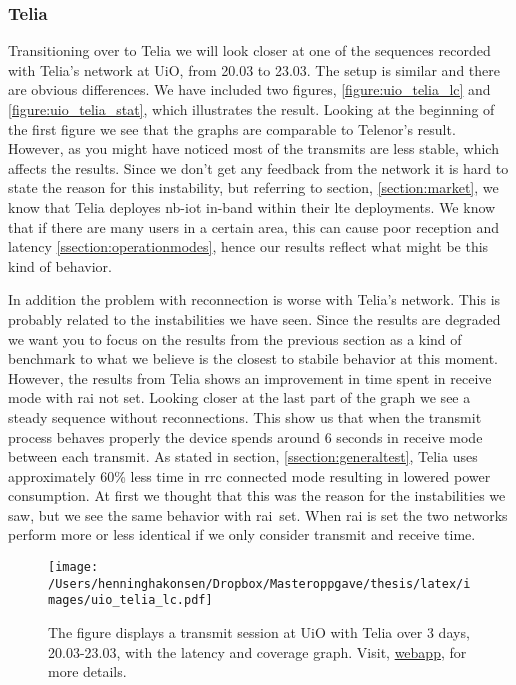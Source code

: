 \documentclass[USenglish]{ifimaster}  %
\begin{document}
\subsubsection{Telia}
Transitioning over to Telia we will look closer at one of the sequences recorded with Telia's network at UiO, from 20.03 to 23.03. The setup is similar and there are obvious differences. We have included two figures, \vref{figure:uio_telia_lc} and \vref{figure:uio_telia_stat}, which illustrates the result.
Looking at the beginning of the first figure we see that the graphs are comparable to Telenor's result. However, as you might have noticed most of the transmits are less stable, which affects the results. Since we don't get any feedback from the network it is hard to state the reason for this instability, but referring to section, \vref{section:market}, we know that Telia deployes \acrshort{nb-iot} in-band within their \acrshort{lte} deployments. We know that if there are many users in a certain area, this can cause poor reception and latency \ref{ssection:operationmodes}, hence our results reflect what might be this kind of behavior.

In addition the problem with reconnection is worse with Telia's network. This is probably related to the instabilities we have seen. Since the results are degraded we want you to focus on the results from the previous section as a kind of benchmark to what we believe is the closest to stabile behavior at this moment. However, the results from Telia shows an improvement in time spent in receive mode with \acrshort{rai} not set. Looking closer at the last part of the graph we see a steady sequence without reconnections. This show us that when the transmit process behaves properly the device spends around 6 seconds in receive mode between each transmit. As stated in section, \vref{ssection:generaltest}, Telia uses approximately 60\% less time in \acrshort{rrc} connected mode resulting in lowered power consumption. At first we thought that this was the reason for the instabilities we saw, but we see the same behavior with \acrshort{rai} set. When \acrshort{rai} is set the two networks perform more or less identical if we only consider transmit and receive time.

\begin{figure}[H]
  \centering
  \texttt{[image: /Users/henninghakonsen/Dropbox/Masteroppgave/thesis/latex/images/uio\_telia\_lc.pdf]}
  \caption[Long-term test - Telia 20.03-23.03, latency and coverage]{The figure displays a transmit session at UiO with Telia over 3 days, 20.03-23.03, with the latency and coverage graph. Visit, \href{http://158.39.77.97:9000/\#/nodes/id1}{webapp}, for more details.}
  \label{figure:uio_telia_lc}
\end{figure}
\end{document}
